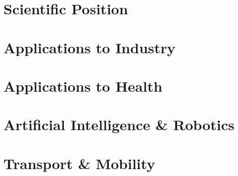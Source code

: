 \tableofcontentslide[onlyparts]

\begin{bibliographysection}

\part{Scientific Position}

\MinskyAItrue %
\OECDAIfalse %
\EUAIActtrue %
\localized
\localized
\localized
\localized
\localized
\localized

\part{Applications to Industry}

\localized
\localized
\localized
\localized

\part{Applications to Health}

\localized
\localized
\localized

\part{Artificial Intelligence \& Robotics}

\localized
\localized
\localized
\localized

\part{Transport \& Mobility}

\localized
\localized
\localized
\localized
\localized


\end{bibliographysection}
